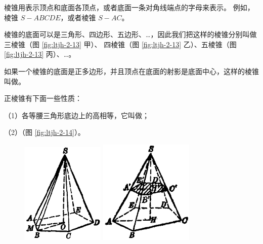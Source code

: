 \begin{enhancedline}
棱锥用表示顶点和底面各顶点，或者底面一条对角线端点的字母来表示。
例如，棱锥 $S{-}ABCDE$，或者棱锥 $S{-}AC$。

棱锥的底面可以是三角形、四边形、五边形、…，因此我们把这样的棱锥分别叫做三棱锥（图 \ref{fig:ltjh-2-13} 甲）、
四棱锥（图 \ref{fig:ltjh-2-13} 乙）、五棱锥（图 \ref{fig:ltjh-2-13} 丙）、…。

如果一个棱锥的底面是正多边形，并且顶点在底面的射影是底面中心，这样的棱锥叫做。

正棱锥有下面一些性质：

（1）各等腰三角形底边上的高相等，它叫做；

（2）（图 \ref{fig:ltjh-2-14}）。

\begin{figure}[htbp]
    \centering
    \begin{minipage}[b]{7cm}
        \centering
        \includegraphics[width=4cm]{../pic/ltjh-ch2-14.png}
        \caption{}\label{fig:ltjh-2-14}
    \end{minipage}
    \qquad
    \begin{minipage}[b]{7cm}
        \centering
        \includegraphics[width=4.5cm]{../pic/ltjh-ch2-15.png}
        \caption{}\label{fig:ltjh-2-15}
    \end{minipage}
\end{figure}


\end{enhancedline}
